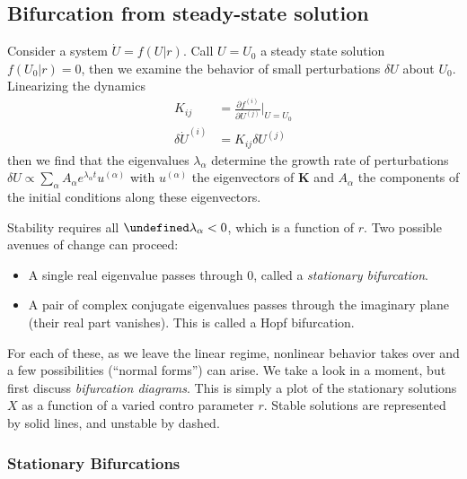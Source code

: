 \documentclass[10pt]{article}
\newcommand{\pd}[2]{\frac{\partial#1}{\partial#2}}
\let\Re\undefined
\DeclareMathOperator{\Re}{Re}
\begin{document}
\subsection{Bifurcation from steady-state solution}

Consider a system $\dot{U} = f(U|r)$. Call $U = U_0$ a steady state solution
$f(U_0|r) = 0$, then we examine the behavior of small perturbations $\delta U$
about $U_0$. Linearizing the dynamics
\begin{align}
    K_{ij} &= \pd{f^{(i)}}{U^{(j)}}\Bigg|_{U=U_0}\\
    \delta\dot{U}^{(i)} &= K_{ij} \delta U^{(j)}
\end{align}
then we find that the eigenvalues $\lambda_\alpha$ determine the growth rate of
perturbations
$\delta U \propto \sum\limits_{\alpha}^{}A_\alpha
e^{\lambda_\alpha t}u^{(\alpha)}$
with $u^{(\alpha)}$ the eigenvectors of $\mathbf{K}$ and $A_\alpha$ the
components of the initial conditions along these eigenvectors.

Stability requires all $\Re \lambda_\alpha < 0$, which is a function of $r$. Two
possible avenues of change can proceed:
\begin{itemize}
    \item A single real eigenvalue passes through $0$, called a \emph{stationary
        bifurcation}.
    \item A pair of complex conjugate eigenvalues passes through the imaginary
        plane (their real part vanishes). This is called a Hopf bifurcation.
\end{itemize}

For each of these, as we leave the linear regime, nonlinear behavior takes over
and a few possibilities (``normal forms'') can arise. We take a look in a
moment, but first discuss \emph{bifurcation diagrams}. This is simply a plot of
the stationary solutions $X$ as a function of a varied contro parameter $r$.
Stable solutions are represented by solid lines, and unstable by dashed.

\subsubsection{Stationary Bifurcations}
\end{document}
